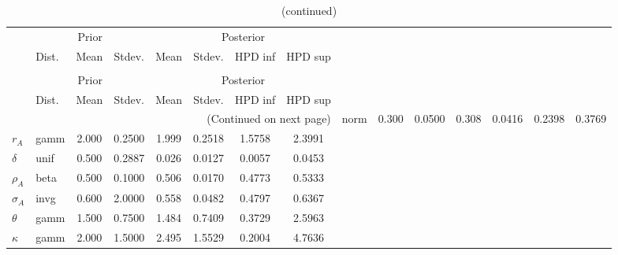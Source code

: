 
\begin{center}
\begin{longtable}{llcccccc} 
\caption{Results from Metropolis-Hastings (parameters)}
 \label{Table:MHPosterior:1}\\
\toprule 
  & \multicolumn{3}{c}{Prior}  &  \multicolumn{4}{c}{Posterior} \\
  \cmidrule(r{.75em}){2-4} \cmidrule(r{.75em}){5-8}
  & Dist. & Mean  & Stdev. & Mean & Stdev. & HPD inf & HPD sup\\
\midrule \endfirsthead 
\caption{(continued)}\\\toprule 
  & \multicolumn{3}{c}{Prior}  &  \multicolumn{4}{c}{Posterior} \\
  \cmidrule(r{.75em}){2-4} \cmidrule(r{.75em}){5-8}
  & Dist. & Mean  & Stdev. & Mean & Stdev. & HPD inf & HPD sup\\
\midrule \endhead 
\bottomrule \multicolumn{8}{r}{(Continued on next page)} \endfoot 
\bottomrule \endlastfoot 
${\alpha}$ & norm &   0.300 & 0.0500 &   0.308& 0.0416 &  0.2398 &  0.3769 \\ 
${r_{A}}$ & gamm &   2.000 & 0.2500 &   1.999& 0.2518 &  1.5758 &  2.3991 \\ 
${\delta}$ & unif &   0.500 & 0.2887 &   0.026& 0.0127 &  0.0057 &  0.0453 \\ 
${\rho_A}$ & beta &   0.500 & 0.1000 &   0.506& 0.0170 &  0.4773 &  0.5333 \\ 
${\sigma_A}$ & invg &   0.600 & 2.0000 &   0.558& 0.0482 &  0.4797 &  0.6367 \\ 
${\theta}$ & gamm &   1.500 & 0.7500 &   1.484& 0.7409 &  0.3729 &  2.5963 \\ 
${\kappa}$ & gamm &   2.000 & 1.5000 &   2.495& 1.5529 &  0.2004 &  4.7636 \\ 
\end{longtable}
 \end{center}
